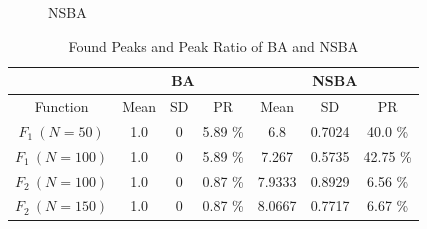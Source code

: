 \documentclass{ies2018}
\begin{document}
\begin{figure}[b]
{\label{fig:f2_nsba100}}

\caption{NSBA}
\label{fig:results_nsba}
\end{figure}

\begin{table}[t]
\caption{Found Peaks and Peak Ratio of BA and NSBA}
\begin{center}
\begin{tabular}{c|c|c|c|c|c|c}
\hline
\multicolumn{1}{c|}{} & \multicolumn{3}{c|}{BA} & \multicolumn{3}{c}{NSBA}  \\
\hline
Function & Mean & SD & PR & Mean & SD & PR \\
\hline
$F_1 \ (N=50)$ & 1.0 & 0 & 5.89 \% & 6.8 & 0.7024 & 40.0 \% \\
\hline
$F_1 \ (N=100)$ & 1.0 & 0 & 5.89 \% & 7.267 & 0.5735 & 42.75 \% \\
\hline
$F_2 \ (N=100)$ & 1.0 & 0 & 0.87 \% & 7.9333 & 0.8929 & 6.56 \% \\
\hline
$F_2 \ (N=150)$ & 1.0 & 0 & 0.87 \% & 8.0667 & 0.7717 & 6.67 \% \\
\hline
\end{tabular}
\label{tab2}
\end{center}
\end{table}
\end{document}
